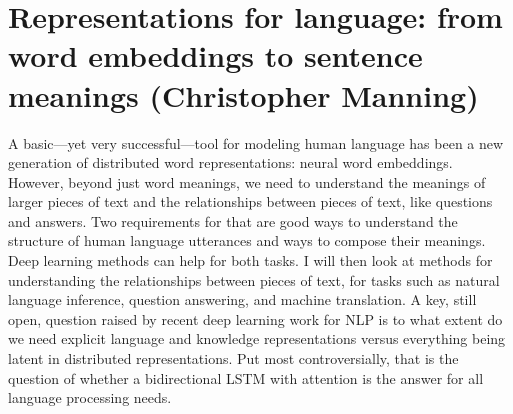 \section{Representations for language: from word embeddings to sentence meanings (Christopher Manning)}



A basic---yet very successful---tool for modeling human language has been a new generation of distributed word representations: neural word embeddings. However, beyond just word meanings, we need to understand the meanings of larger pieces of text and the relationships between pieces of text, like questions and answers. Two requirements for that are good ways to understand the structure of human language utterances and ways to compose their meanings. Deep learning methods can help for both tasks. I will then look at methods for understanding the relationships between pieces of text, for tasks such as natural language inference, question answering, and machine translation. A key, still open, question raised by recent deep learning work for NLP is to what extent do we need explicit language and knowledge representations versus everything being latent in distributed representations. Put most controversially, that is the question of whether a bidirectional LSTM with attention is the answer for all language processing needs.

